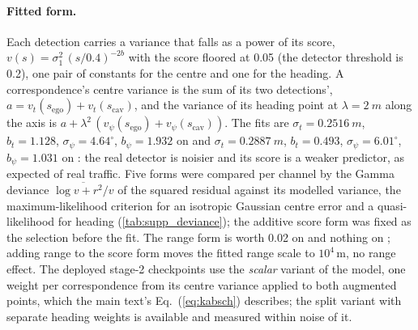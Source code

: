 \begin{table}[t]
  \centering\small
  \caption{\textbf{Cross-agent disagreement by score decile} under the true pose on validation: RMS centre distance (m) and RMS heading difference (deg); first, middle and last decile of $\min(s_{\mathrm{ego}},s_{\mathrm{cav}})$. Sources: \texttt{correspondence\_variance\_result.json} (\opvv), \texttt{variance\_fit\_result.json} (\vxreal).}
  \label{tab:supp_deciles}
\end{table}

\paragraph{Fitted form.}
Each detection carries a variance that falls as a power of its score, $v(s)=\sigma_1^2\,(s/0.4)^{-2b}$ with the score floored at 0.05 (the detector threshold is 0.2), one pair of constants for the centre and one for the heading. A correspondence's centre variance is the sum of its two detections', $a=v_t(s_{\mathrm{ego}})+v_t(s_{\mathrm{cav}})$, and the variance of its heading point at $\lambda=\SI{2}{m}$ along the axis is $a+\lambda^2\,(v_\psi(s_{\mathrm{ego}})+v_\psi(s_{\mathrm{cav}}))$. The fits are $\sigma_t=\SI{0.2516}{m}$, $b_t=1.128$, $\sigma_\psi=4.64^\circ$, $b_\psi=1.932$ on \opvv and $\sigma_t=\SI{0.2887}{m}$, $b_t=0.493$, $\sigma_\psi=6.01^\circ$, $b_\psi=1.031$ on \vxreal: the real detector is noisier and its score is a weaker predictor, as expected of real traffic. Five forms were compared per channel by the Gamma deviance $\overline{\log v+r^2/v}$ of the squared residual against its modelled variance, the maximum-likelihood criterion for an isotropic Gaussian centre error and a quasi-likelihood for heading (\cref{tab:supp_deviance}); the additive score form was fixed as the selection before the fit. The range form is worth 0.02 on \opvv and nothing on \vxreal; adding range to the score form moves the fitted range scale to $10^{4}$\,m, \ie no range effect. The deployed stage-2 checkpoints use the \emph{scalar} variant of the model, one weight per correspondence from its centre variance applied to both augmented points, which the main text's Eq.~(\ref{eq:kabsch}) describes; the split variant with separate heading weights is available and measured within noise of it.


